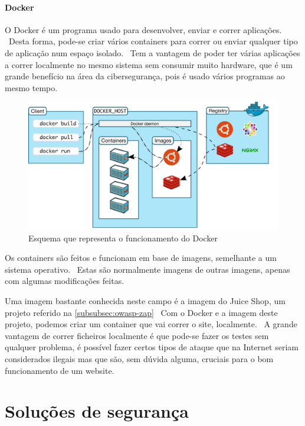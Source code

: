 \documentclass{report}
\begin{document}
\subsubsection{Docker}
\label{subsubsec:docker}
O Docker é um programa usado para desenvolver, enviar e correr aplicações. \ Desta forma, pode-se criar vários containers para correr ou enviar qualquer tipo de aplicação num espaço isolado. \ Tem a vantagem de poder ter várias aplicações a correr localmente no mesmo sistema sem consumir muito hardware, que é um grande benefício na área da cibersegurança, pois é usado vários programas ao mesmo tempo.

\begin{figure}
    \centering
    \includegraphics[width=350pt]{docker-scheme}
    \caption{Esquema que representa o funcionamento do Docker}
    \label{fig:docker-scheme}
\end{figure}

Os containers são feitos e funcionam em base de imagens, semelhante a um sistema operativo. \ Estas são normalmente imagens de outras imagens, apenas com algumas modificações feitas. \bigskip

Uma imagem bastante conhecida neste campo é a imagem do Juice Shop, um projeto referido na \autoref{subsubsec:owasp-zap} \ Com o Docker e a imagem deste projeto, podemos criar um container que vai correr o site, localmente. \ A grande vantagem de correr ficheiros localmente é que pode-se fazer os testes sem qualquer problema, é possível fazer certos tipos de ataque que na Internet seriam considerados ilegais mas que são, sem dúvida alguma, cruciais para o bom funcionamento de um website.

\chapter{Soluções de segurança}
\label{ch:solucoes-de-seguranca}
\end{document}
